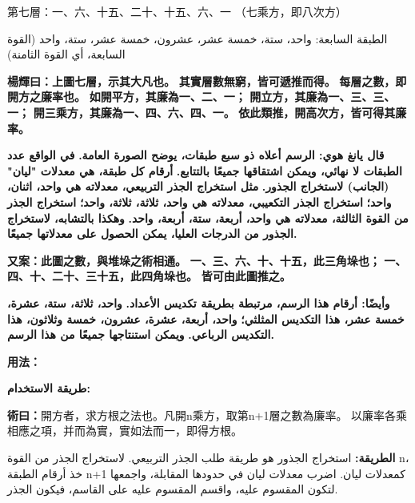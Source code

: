 \documentclass[11pt,a4paper]{article}
\newcommand{\bilingualrow}[2]{%
\noindent\begin{minipage}[t]{0.48\textwidth}#1\end{minipage}\hfill\begin{minipage}[t]{0.48\textwidth}\arabicfont\beginR #2\endR\end{minipage}\par\vspace{0.5cm}}
\begin{document}
\bilingualrow{
第七層：一、六、十五、二十、十五、六、一 \quad（七乘方，即八次方）
}{
الطبقة السابعة: واحد، ستة، خمسة عشر، عشرون، خمسة عشر، ستة، واحد \quad (القوة السابعة، أي القوة الثامنة)
}

\vspace{1em}

\bilingualrow{
\textbf{\color{commentarycolor}楊輝曰：上圖七層，示其大凡也。}
\textbf{\color{commentarycolor}其實層數無窮，皆可遞推而得。}
\textbf{\color{commentarycolor}每層之數，即開方之廉率也。}
\textbf{\color{commentarycolor}如開平方，其廉為一、二、一；}
\textbf{\color{commentarycolor}開立方，其廉為一、三、三、一；}
\textbf{\color{commentarycolor}開三乘方，其廉為一、四、六、四、一。}
\textbf{\color{commentarycolor}依此類推，開高次方，皆可得其廉率。}
}{
\textbf{\color{commentarycolor}قال يانغ هوي: الرسم أعلاه ذو سبع طبقات، يوضح الصورة العامة.}
\textbf{\color{commentarycolor}في الواقع عدد الطبقات لا نهائي، ويمكن اشتقاقها جميعًا بالتتابع.}
\textbf{\color{commentarycolor}أرقام كل طبقة، هي معدلات "ليان" (الجانب) لاستخراج الجذور.}
\textbf{\color{commentarycolor}مثل استخراج الجذر التربيعي، معدلاته هي واحد، اثنان، واحد؛}
\textbf{\color{commentarycolor}استخراج الجذر التكعيبي، معدلاته هي واحد، ثلاثة، ثلاثة، واحد؛}
\textbf{\color{commentarycolor}استخراج الجذر من القوة الثالثة، معدلاته هي واحد، أربعة، ستة، أربعة، واحد.}
\textbf{\color{commentarycolor}وهكذا بالتشابه، لاستخراج الجذور من الدرجات العليا، يمكن الحصول على معدلاتها جميعًا.}
}

\vspace{0.5em}

\bilingualrow{
\textbf{\color{commentarycolor}又案：此圖之數，與堆垛之術相通。}
\textbf{\color{commentarycolor}一、三、六、十、十五，此三角垛也；}
\textbf{\color{commentarycolor}一、四、十、二十、三十五，此四角垛也。}
\textbf{\color{commentarycolor}皆可由此圖推之。}
}{
\textbf{\color{commentarycolor}وأيضًا: أرقام هذا الرسم، مرتبطة بطريقة تكديس الأعداد.}
\textbf{\color{commentarycolor}واحد، ثلاثة، ستة، عشرة، خمسة عشر، هذا التكديس المثلثي؛}
\textbf{\color{commentarycolor}واحد، أربعة، عشرة، عشرون، خمسة وثلاثون، هذا التكديس الرباعي.}
\textbf{\color{commentarycolor}ويمكن استنتاجها جميعًا من هذا الرسم.}
}

\vspace{1.5em}

\bilingualrow{
\textbf{用法：}
}{
\textbf{طريقة الاستخدام:}
}

\vspace{0.3em}

\bilingualrow{
\textcolor{methodcolor}{\textbf{術曰：}}開方者，求方根之法也。凡開n乘方，取第n+1層之數為廉率。
以廉率各乘相應之項，并而為實，實如法而一，即得方根。
}{
\textcolor{methodcolor}{\textbf{الطريقة:}} استخراج الجذور هو طريقة طلب الجذر التربيعي. لاستخراج الجذر من القوة n، خذ أرقام الطبقة n+1 كمعدلات ليان.
اضرب معدلات ليان في حدودها المقابلة، واجمعها لتكون المقسوم عليه، واقسم المقسوم عليه على القاسم، فيكون الجذر.
}
\end{document}
